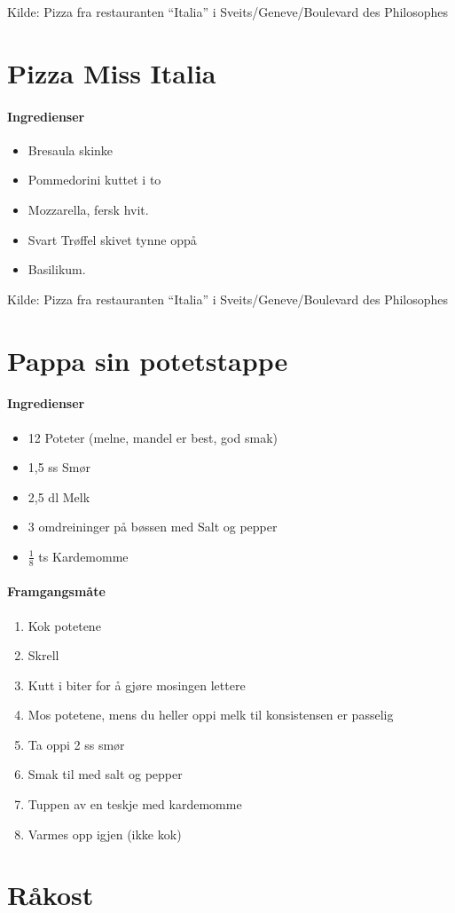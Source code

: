 \documentclass[12pt,a4paper]{book}
\begin{document}
Kilde: Pizza fra restauranten “Italia” i Sveits/Geneve/Boulevard des Philosophes
\clearpage{}
\clearpage{}\section{﻿Pizza Miss Italia}


\paragraph{Ingredienser}
\begin{itemize}[noitemsep]
	\item Bresaula skinke
	\item Pommedorini kuttet i to
	\item Mozzarella, fersk hvit.
	\item Svart Trøffel skivet tynne oppå
	\item Basilikum.
\end{itemize}




Kilde: Pizza fra restauranten “Italia” i Sveits/Geneve/Boulevard des Philosophes
\clearpage{}
\clearpage{}\section{﻿Pappa sin potetstappe}


\paragraph{Ingredienser}
\begin{itemize}[noitemsep]
	\item 12 Poteter (melne, mandel er best, god smak)
	\item 1,5 ss Smør
	\item 2,5 dl Melk
	\item 3 omdreininger på bøssen med Salt og pepper
	\item $\frac{1}{8}$ ts Kardemomme
\end{itemize}

\paragraph{Framgangsmåte}
\begin{enumerate}[noitemsep]
	\item Kok potetene
	\item Skrell
	\item Kutt i biter for å gjøre mosingen lettere
	\item Mos potetene, mens du heller oppi melk til konsistensen er passelig
	\item Ta oppi 2 ss smør
	\item Smak til med salt og pepper
	\item Tuppen av en teskje med kardemomme
	\item Varmes opp igjen (ikke kok)
\end{enumerate}
\clearpage{}
\clearpage{}\section{﻿Råkost}
\end{document}
